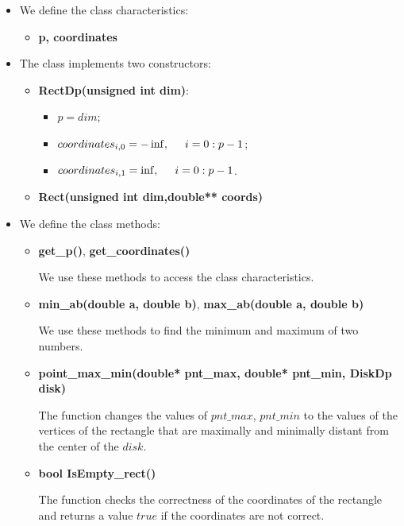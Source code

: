 \documentclass{report}
\begin{document}
	\begin{itemize}
		\item We define the class characteristics: 
		\begin{itemize}
			\item {\bfseries p, coordinates} 
		\end{itemize}
		
		\item The class implements two constructors:
		\begin{itemize}
			\item {\bfseries RectDp(unsigned int dim)}:
			\begin{itemize}
					\item $p = dim$;
					\item $coordinates_{i,0}= -\inf, \hspace*{5mm}  i = 0:p-1$;
					\item $coordinates_{i,1} = \inf,  \hspace*{5mm} i = 0:p-1$.
			\end{itemize}
			
			\item {\bfseries Rect(unsigned int dim,double** coords)}
		\end{itemize}
		
		\item We define the class methods:
		
		\begin{itemize}
			\item {\bfseries get\_p()}, {\bfseries get\_coordinates()}
			
			We use these  methods to access the class characteristics.
			
			\item {\bfseries min\_ab(double a, double b)}, {\bfseries max\_ab(double a, double b)}
			
			We use these  methods  to find the minimum and maximum of two numbers.
			
			\item {\bfseries point\_max\_min(double* pnt\_max, double* pnt\_min, DiskDp disk)}
			 
			The function changes the values of $pnt\_max$, $pnt\_min$ to the values of the vertices of the rectangle that are maximally and minimally distant from the center of the $disk$.
			 
			\item {\bfseries bool IsEmpty\_rect()} 
			
			The function checks the correctness of the coordinates of the rectangle and returns a  value $true$ if the coordinates are not correct.
			

\end{itemize}
\end{itemize}
\end{document}
